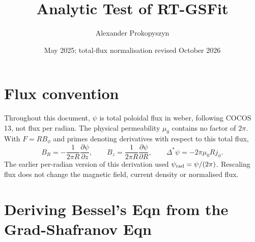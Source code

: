 \documentclass{article}
\title{Analytic Test of RT-GSFit}
\author{Alexander Prokopyszyn}
\date{May 2025; total-flux normalisation revised October 2026}
\begin{document}
\maketitle

\section*{Flux convention}

Throughout this document, $\psi$ is total poloidal flux in weber, following COCOS 13,
not flux per radian. The physical permeability $\mu_0$ contains no factor of $2\pi$.
With $F=RB_\phi$ and primes denoting derivatives with respect to this total flux,
\[
B_R=-\frac{1}{2\pi R}\frac{\partial\psi}{\partial z},
\qquad
B_z=\frac{1}{2\pi R}\frac{\partial\psi}{\partial R},
\qquad
\Delta^*\psi=-2\pi\mu_0Rj_\phi.
\]
The earlier per-radian version of this derivation used
$\psi_{\rm rad}=\psi/(2\pi)$. Rescaling flux does not change the magnetic field,
current density or normalised flux.

\section{Deriving Bessel's Eqn from the Grad-Shafranov Eqn}
\end{document}

